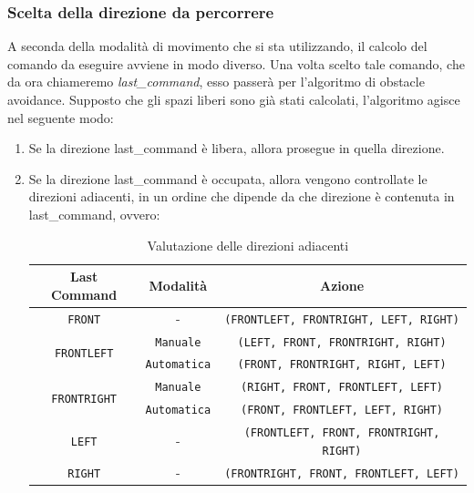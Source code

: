 \documentclass[]{article}
\begin{document}
\subsubsection{Scelta della direzione da percorrere}
A seconda della modalità di movimento che si sta utilizzando, il calcolo del comando da eseguire avviene in modo diverso. Una volta scelto tale comando, che da ora chiameremo \textit{last\_command}, esso passerà per l'algoritmo di obstacle avoidance. Supposto che gli spazi liberi sono già stati calcolati, l'algoritmo agisce nel seguente modo:
\begin{enumerate}
    \item Se la direzione last\_command è libera, allora prosegue in quella direzione.
    \item Se la direzione last\_command è occupata, allora vengono controllate le direzioni adiacenti, in un ordine che dipende da che direzione è contenuta in last\_command, ovvero:


          \begin{table}[H]
              \centering
              \begin{tabular}{|c|c|c|}
                  \hline
                  \textbf{Last Command}                & \textbf{Modalità}   & \textbf{Azione}                                \\
                  \hline
                  \texttt{FRONT}                       & -                   & \texttt{(FRONTLEFT, FRONTRIGHT, LEFT, RIGHT)}  \\
                  \hline
                  \multirow{2}{*}{\texttt{FRONTLEFT}}  & \texttt{Manuale}    & \texttt{(LEFT, FRONT, FRONTRIGHT, RIGHT)}      \\

                  \cline{2-3}
                                                       & \texttt{Automatica} & \texttt{(FRONT, FRONTRIGHT, RIGHT, LEFT)}      \\
                  \hline
                  \multirow{2}{*}{\texttt{FRONTRIGHT}} & \texttt{Manuale}    & \texttt{(RIGHT, FRONT, FRONTLEFT, LEFT)}       \\
                  \cline{2-3}
                                                       & \texttt{Automatica} & \texttt{(FRONT, FRONTLEFT, LEFT, RIGHT)}       \\
                  \hline

                  \texttt{LEFT}                        & -                   & \texttt{(FRONTLEFT, FRONT, FRONTRIGHT, RIGHT)} \\
                  \hline
                  \texttt{RIGHT}                       & -                   & \texttt{(FRONTRIGHT, FRONT, FRONTLEFT, LEFT)}  \\
                  \hline
              \end{tabular}
              \caption{Valutazione delle direzioni adiacenti}
          \end{table}
\end{enumerate}
\end{document}
